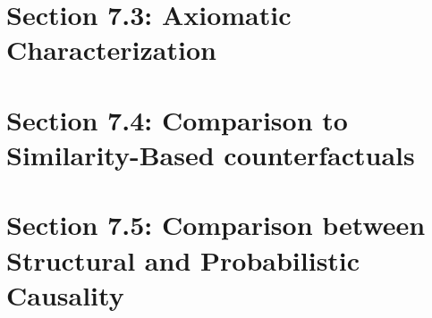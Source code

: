 \documentclass[oneside]{book}
\begin{document}


\section{Section 7.3: Axiomatic Characterization}



\section{Section 7.4: Comparison to Similarity-Based counterfactuals}



\section{Section 7.5: Comparison between Structural and Probabilistic Causality}


\end{document}
